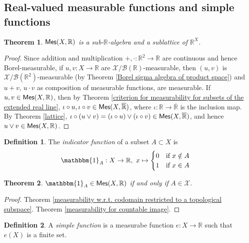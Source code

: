 \documentclass[11pt, a4paper, openany]{book}
\newtheorem{thm}{Theorem}\newtheorem{lem}{Lemma}\newtheorem{crl}{Corollary}
\theoremstyle{definition}
\newtheorem{define}{Definition}\newtheorem{exam}{Example}\newtheorem{remark}{Remark}
\newcommand{\cat}[1]{\textup{\textsf{#1}}}
\newcommand{\er}{\overline{\mathbb{R}}}
\begin{document}
\subsection{Real-valued measurable functions and simple functions}
    \begin{thm}\label{subalgebra and sublattice structure of real measurable functions}
        $\cat{Mes}(X,\mathbb{R})$ is a sub-$\mathbb{R}$-algebra and a sublattice of $\mathbb{R}^X$.
    \end{thm}
    \begin{proof}
        Since addition and multiplication $+,\cdot:\mathbb{R}^2\rightarrow\mathbb{R}$ are continuous and hence Borel-measurable, if $u,v:X\rightarrow\mathbb{R}$ are $\mathscr{X}/\mathscr{B}(\mathbb{R})$-measurable, then $(u,v)$ is $\mathscr{X}/\mathscr{B}(\mathbb{R}^2)$-measurable (by Theorem \ref{Borel sigma algebra of product space}) and $u+v,\,u\cdot v$ as composition of measurable functions, are measurable. If $u,v\in \cat{Mes}(X,\mathbb{R})$, then by Theorem \ref{criterion for measurability for subsets of the extended real line}, $\iota \circ u,\iota\circ v\in\cat{Mes}(X,\er)$, where $\iota:\mathbb{R}\rightarrow\er$ is the inclusion map. By Theorem \ref{lattice}, $\iota\circ(u\vee v)=(\iota\circ u)\vee(\iota\circ v)\in\cat{Mes}(X,\er)$, and hence $u\vee v\in \cat{Mes}(X,\mathbb{R})$.
    \end{proof}
    \begin{define}
        The \textit{indicator function} of a subset $A\subset X$ is
        \[
            \mathbbm{1}_A:X\rightarrow \mathbb{R},\,\, x\mapsto\begin{cases}
                0&\text{if }x\notin A\\
                1&\text{if }x\in A
            \end{cases}
        \] 
    \end{define}
    \begin{thm}
        $\mathbbm{1}_A\in\cat{Mes}(X,\mathbb{R})$ if and only if $A\in\mathscr{X}$.
    \end{thm}
    \begin{proof}
        Theorem \ref{measurability w.r.t. codomain restricted to a topological subspace}. Theorem \ref{measurability for countable image}.
    \end{proof}
    \begin{define}
        A \textit{simple function} is a measurabe function $e:X\rightarrow \mathbb{R}$ such that $e(X)$ is a finite set.
    \end{define}
\end{document}
